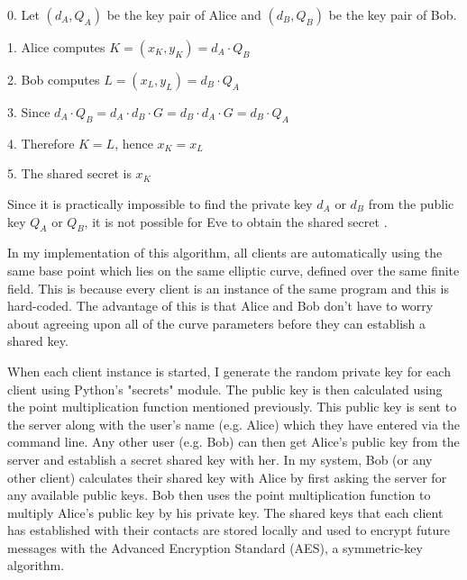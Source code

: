 \documentclass[12pt,a4paper]{article}
\begin{document}
\vspace{1mm}

0. \space Let $(d_A,Q_A)$ be the key pair of Alice and $(d_B,Q_B)$ be the key pair of Bob.

1. \space Alice computes $K = (x_K,y_K) = d_A \cdot Q_B$

2. \space Bob computes $L = (x_L,y_L) = d_B \cdot Q_A$

3. \space Since $d_A \cdot Q_B = d_A \cdot d_B \cdot G = d_B \cdot d_A \cdot G = d_B \cdot Q_A$

4. \space Therefore $K = L$, \space hence $x_K = x_L$

5. \space The shared secret is $x_K$

\vspace{1mm}

Since it is practically impossible to find the private key $d_A$ or $d_B$ from the public key $Q_A$ or $Q_B$, 
it is not possible for Eve to obtain the shared secret \cite{jurivsic1997elliptic,anoop2007elliptic,brown2009standards,silverman2009arithmetic}. 

\vspace{5mm}

In my implementation of this algorithm, all clients are automatically using the same base point which lies 
on the same elliptic curve, defined over the same finite field. 
This is because every client is an instance of the same program and this is hard-coded. 
The advantage of this is that Alice and Bob don't have to worry about agreeing upon all of the 
curve parameters before they can establish a shared key. 

When each client instance is started, I generate the random private key for each client using Python's "secrets" module. 
The public key is then calculated using the point multiplication function mentioned previously. 
This public key is sent to the server along with the user's name (e.g. Alice) which they have entered via the command line. 
Any other user (e.g. Bob) can then get Alice's public key from the server and establish a secret shared key with her. 
In my system, Bob (or any other client) calculates their shared key with Alice by first asking the server 
for any available public keys. 
Bob then uses the point multiplication function to multiply Alice's public key by his private key. 
The shared keys that each client has established with their contacts are stored locally 
and used to encrypt future messages with the Advanced Encryption Standard (AES), a symmetric-key algorithm. 
\end{document}
